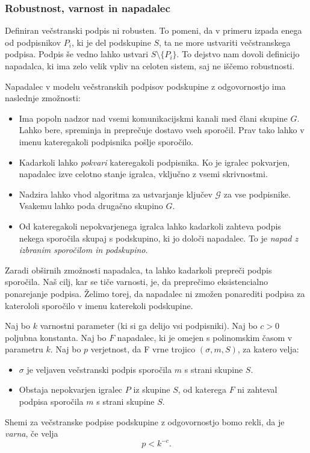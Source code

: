 \documentclass[isrm2, tisk]{fmfdelo}
\begin{document}
\subsubsection{Robustnost, varnost in napadalec}
Definiran večstranski podpis ni robusten. To pomeni, da v primeru izpada enega od podpisnikov $P_i$, 
ki je del podskupine $S$, ta ne more ustvariti večstranskega podpisa. Podpis še vedno lahko ustvari 
$S \setminus \{P_i\}$. To dejstvo nam dovoli definicijo napadalca, ki ima zelo velik vpliv na celoten 
sistem, saj ne iščemo robustnosti. 

\begin{definicija}
    Napadalec v modelu večstranskih podpisov podskupine z odgovornostjo ima naslednje zmožnosti:
    \begin{itemize}
        \item Ima popoln nadzor nad vsemi komunikacijskmi kanali med člani skupine $G$. Lahko bere, 
            spreminja in preprečuje dostavo vseh sporočil. Prav tako lahko v imenu kateregakoli 
            podpisnika pošlje sporočilo.
        \item Kadarkoli lahko \textit{pokvari} kateregakoli podpisnika. Ko je igralec pokvarjen, 
            napadalec izve celotno stanje igralca, vključno z vsemi skrivnostmi.
        \item Nadzira lahko vhod algoritma za ustvarjanje ključev $\mathcal{G}$ za vse podpisnike. 
            Vsakemu lahko poda drugačno skupino $G$.
        \item Od kateregakoli nepokvarjenega igralca lahko kadarkoli zahteva podpis nekega sporočila 
            skupaj s podskupino, ki jo določi napadalec. To je \textit{napad z izbranim sporočilom 
            in podskupino}.
    \end{itemize}
\end{definicija}

Zaradi obširnih zmožnosti napadalca, ta lahko kadarkoli prepreči podpis sporočila. Naš cilj, kar se 
tiče varnosti, je, da preprečimo eksistencialno ponarejanje podpisa. Želimo torej, da napadalec ni 
zmožen ponarediti podpisa za katerololi sporočilo v imenu katerekoli podskupine.

\begin{definicija}
    Naj bo $k$ varnostni parameter (ki si ga delijo vsi podpisniki). Naj bo $c > 0$ poljubna konstanta. 
    Naj bo $F$ napadalec, ki je omejen s polinomskim časom v parametru $k$. Naj bo $p$ verjetnost, da 
    F vrne trojico $(\sigma, m, S)$, za katero velja: 
    \begin{itemize}
        \item $\sigma$ je veljaven večstranski podpis sporočila $m$ s strani skupine $S$.
        \item Obstaja nepokvarjen igralec $P$ iz skupine $S$, od katerega $F$ ni zahteval podpisa 
            sporočila $m$ s strani skupine $S$.
    \end{itemize}
    Shemi za večstranske 
    podpise podskupine z odgovornostjo bomo rekli, da je \textit{varna}, če velja 
    $$ 
    p < k^{-c}.
    $$
\end{definicija}
\end{document}

